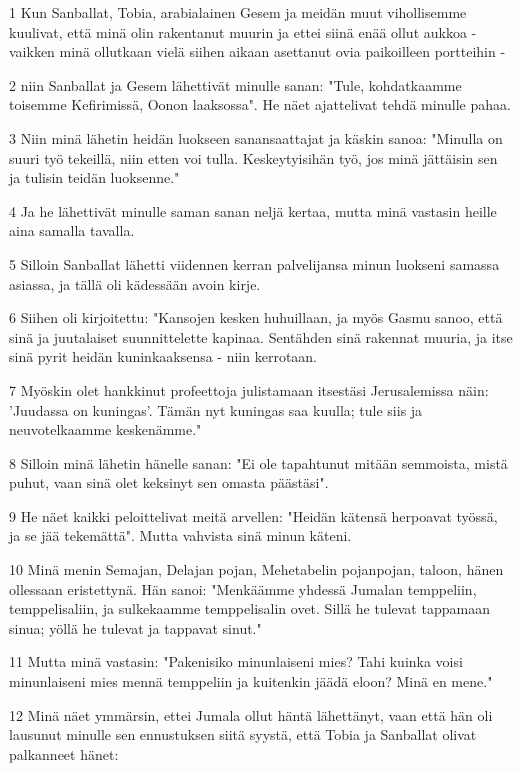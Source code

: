 \par 1 Kun Sanballat, Tobia, arabialainen Gesem ja meidän muut vihollisemme kuulivat, että minä olin rakentanut muurin ja ettei siinä enää ollut aukkoa - vaikken minä ollutkaan vielä siihen aikaan asettanut ovia paikoilleen portteihin -
\par 2 niin Sanballat ja Gesem lähettivät minulle sanan: "Tule, kohdatkaamme toisemme Kefirimissä, Oonon laaksossa". He näet ajattelivat tehdä minulle pahaa.
\par 3 Niin minä lähetin heidän luokseen sanansaattajat ja käskin sanoa: "Minulla on suuri työ tekeillä, niin etten voi tulla. Keskeytyisihän työ, jos minä jättäisin sen ja tulisin teidän luoksenne."
\par 4 Ja he lähettivät minulle saman sanan neljä kertaa, mutta minä vastasin heille aina samalla tavalla.
\par 5 Silloin Sanballat lähetti viidennen kerran palvelijansa minun luokseni samassa asiassa, ja tällä oli kädessään avoin kirje.
\par 6 Siihen oli kirjoitettu: "Kansojen kesken huhuillaan, ja myös Gasmu sanoo, että sinä ja juutalaiset suunnittelette kapinaa. Sentähden sinä rakennat muuria, ja itse sinä pyrit heidän kuninkaaksensa - niin kerrotaan.
\par 7 Myöskin olet hankkinut profeettoja julistamaan itsestäsi Jerusalemissa näin: 'Juudassa on kuningas'. Tämän nyt kuningas saa kuulla; tule siis ja neuvotelkaamme keskenämme."
\par 8 Silloin minä lähetin hänelle sanan: "Ei ole tapahtunut mitään semmoista, mistä puhut, vaan sinä olet keksinyt sen omasta päästäsi".
\par 9 He näet kaikki peloittelivat meitä arvellen: "Heidän kätensä herpoavat työssä, ja se jää tekemättä". Mutta vahvista sinä minun käteni.
\par 10 Minä menin Semajan, Delajan pojan, Mehetabelin pojanpojan, taloon, hänen ollessaan eristettynä. Hän sanoi: "Menkäämme yhdessä Jumalan temppeliin, temppelisaliin, ja sulkekaamme temppelisalin ovet. Sillä he tulevat tappamaan sinua; yöllä he tulevat ja tappavat sinut."
\par 11 Mutta minä vastasin: "Pakenisiko minunlaiseni mies? Tahi kuinka voisi minunlaiseni mies mennä temppeliin ja kuitenkin jäädä eloon? Minä en mene."
\par 12 Minä näet ymmärsin, ettei Jumala ollut häntä lähettänyt, vaan että hän oli lausunut minulle sen ennustuksen siitä syystä, että Tobia ja Sanballat olivat palkanneet hänet:
